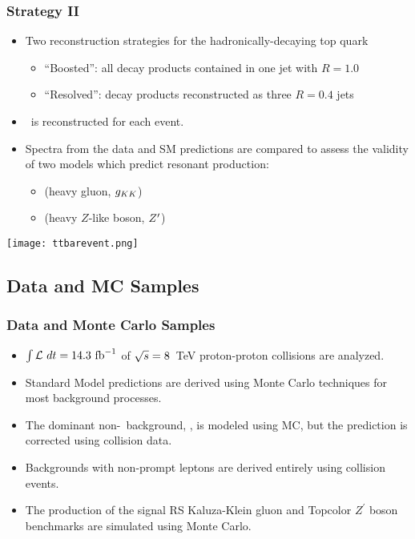 \begin{frame}[label=strat2]
    \frametitle{Strategy II}
    \centering
\begin{itemize}
    \item Two reconstruction strategies for the hadronically-decaying
        top quark
        \begin{itemize}
        \item ``Boosted'': all decay products contained in one jet
            with $R=1.0$
        \item ``Resolved'': decay products reconstructed as three
            $R=0.4$ jets
        \end{itemize}
    \item \mtt\ is reconstructed for each event.
    \item Spectra from the data and SM predictions are compared to
        assess the validity of two models which predict resonant
        production:
    \begin{itemize}
        \item {} (heavy gluon, $g_{KK}$)
        \item {} (heavy
    $Z$-like boson, $Z^\prime$)
    \end{itemize}
\end{itemize}
\texttt{[image: ttbarevent.png]}
\end{frame}

\subsection{Data and MC Samples}

\begin{frame}
    \frametitle{Data and Monte Carlo Samples}
\begin{itemize}
    \item $\int \mathcal{L}~dt = 14.3~{\rm fb}^{-1}$ of $\sqrt{s} =
        8$~TeV proton-proton collisions are analyzed.
    \item Standard Model predictions are derived using Monte Carlo
        techniques for most background processes.
    \item The dominant non-\ttbar\ background, \wjets, is modeled
        using MC, but the prediction is corrected using collision
        data.
    \item Backgrounds with non-prompt leptons are derived entirely
        using collision events.
    \item The production of the signal RS Kaluza-Klein gluon and Topcolor $Z^\prime$
        boson benchmarks are simulated using Monte Carlo.
\end{itemize}
\end{frame}

